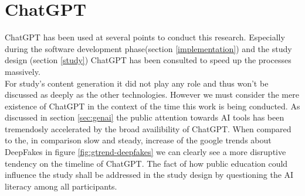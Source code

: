 \documentclass[
  a4paper,  %
  twoside,  %
  bibliography=totoc,
  headsepline,
  cleardoublepage=empty,
  parskip=half,
  draft=false
]{scrbook}
\begin{document}
\section{ChatGPT}
ChatGPT has been used at several points to conduct this research. Especially during the software development phase(section \ref{implementation}) and the study design (section \ref{study}) ChatGPT has been consulted to speed up the processes massively. \\ 
For study's content generation it did not play any role and thus won't be discussed as deeply as the other technologies. However we must consider the mere existence of ChatGPT in the context of the time this work is being conducted. As discussed in section \ref{sec:genai} the public attention towards AI tools has been tremendosly accelerated by the broad availibility of ChatGPT. When compared to the, in comparison slow and steady, increase of the google trends about DeepFakes in figure \ref{fig:gtrend-deepfakes} we can clearly see a more disruptive tendency on the timeline of ChatGPT.
The fact of how public education could influence the study shall be addressed in the study design by questioning the AI literacy among all participants. 
\end{document}
